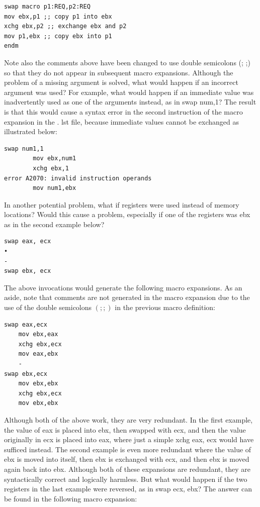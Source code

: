 \documentclass[10pt]{article}
\begin{document}
\begin{verbatim}
swap macro p1:REQ,p2:REQ
mov ebx,p1 ;; copy p1 into ebx
xchg ebx,p2 ;; exchange ebx and p2
mov p1,ebx ;; copy ebx into p1
endm
\end{verbatim}

Note also the comments above have been changed to use double semicolons (; ;) so that they do not appear in subsequent macro expansions. Although the problem of a missing argument is solved, what would happen if an incorrect argument was used? For example, what would happen if an immediate value was inadvertently used as one of the arguments instead, as in swap num,1? The result is that this would cause a syntax error in the second instruction of the macro\\
expansion in the . lst file, because immediate values cannot be exchanged as illustrated below:

\begin{verbatim}
swap num1,1
        mov ebx,num1
        xchg ebx,1
error A2070: invalid instruction operands
        mov num1,ebx
\end{verbatim}

In another potential problem, what if registers were used instead of memory locations? Would this cause a problem, especially if one of the registers was ebx as in the second example below?

\begin{verbatim}
swap eax, ecx
•
-
swap ebx, ecx
\end{verbatim}

The above invocations would generate the following macro expansions. As an aside, note that comments are not generated in the macro expansion due to the use of the double semicolons $(; ;)$ in the previous macro definition:

\begin{verbatim}
swap eax,ecx
    mov ebx,eax
    xchg ebx,ecx
    mov eax,ebx
    -
swap ebx,ecx
    mov ebx,ebx
    xchg ebx,ecx
    mov ebx,ebx
\end{verbatim}

Although both of the above work, they are very redundant. In the first example, the value of eax is placed into ebx, then swapped with ecx, and then the value originally in ecx is placed into eax, where just a simple xchg eax, ecx would have sufficed instead. The second example is even more redundant where the value of ebx is moved into itself, then ebx is exchanged with ecx, and then ebx is moved again back into ebx. Although both of these expansions are redundant, they are syntactically correct and logically harmless. But what would happen if the two registers in the last example were reversed, as in swap ecx, ebx? The answer can be found in the following macro expansion:
\end{document}
